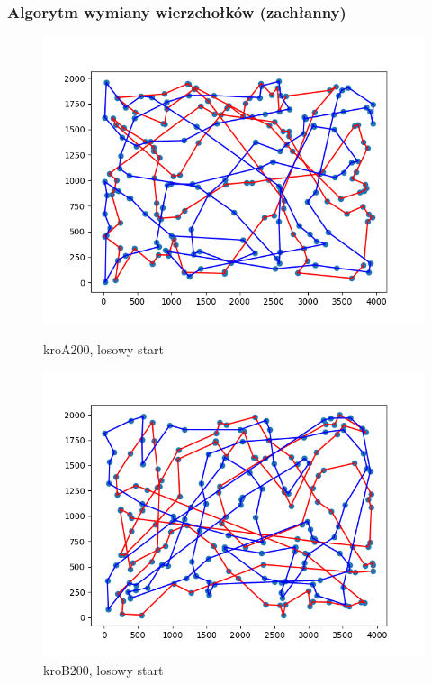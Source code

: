 \documentclass[11pt]{article}
\begin{document}
\subsubsection{Algorytm wymiany wierzchołków (zachłanny)}
\begin{figure}[H]
    \centering
    \begin{minipage}[t]{0.45\textwidth}
        \centering
        \includegraphics[width=\linewidth]{best_paths/kroA200/traverse_greedy_vertex/randomstart}
        \caption{kroA200, losowy start}
    \end{minipage}
    \hfill
    \begin{minipage}[t]{0.45\textwidth}
        \centering
        \includegraphics[width=\linewidth]{best_paths/kroB200/traverse_greedy_vertex/randomstart}
        \caption{kroB200, losowy start}
    \end{minipage}


\end{figure}
\end{document}
